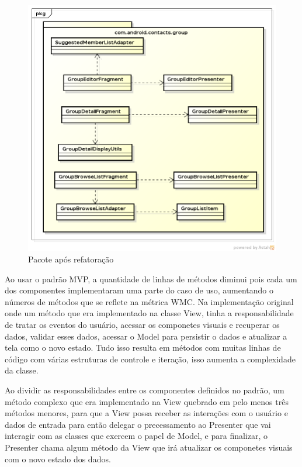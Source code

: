 \documentclass[conference]{IEEEtran}
\begin{document}
\begin{figure}[htb]
	\begin{center}
		\includegraphics[scale=0.3]{img/classes_iteracao3}
	\end{center}
	\caption{\label{fig:classes_iteracao3} Pacote após refatoração}
	
\end{figure}

Ao usar o padrão MVP, a quantidade de linhas de métodos diminui pois cada um
dos componentes implementaram uma parte do caso de uso, aumentando o números de
métodos que se reflete na métrica WMC. Na implementação original onde um método
que era implementado na classe View, tinha a  responsabilidade de tratar os
eventos do usuário, acessar os componetes visuais e recuperar os dados, validar
esses dados, acessar o Model para persistir o dados e atualizar a tela como o
novo estado. Tudo isso resulta em métodos com muitas linhas de código com várias
estruturas de controle e iteração, isso aumenta a complexidade da classe.

Ao dividir as responsabilidades entre os componentes definidos no padrão, um
método complexo que era implementado na View quebrado em pelo menos três métodos
menores, para que a View possa receber as interações com o usuário e dados de
entrada para então delegar o precessamento ao Presenter que vai interagir com as
classes que exercem o papel de Model, e para finalizar, o Presenter chama algum
método da View que irá atualizar os componetes visuais com o novo estado dos
dados.
\end{document}
